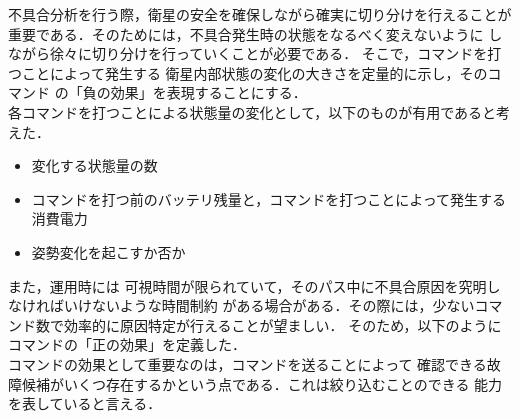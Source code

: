 \documentclass[11pt]{article}
\begin{document}
不具合分析を行う際，衛星の安全を確保しながら確実に切り分けを行えることが
重要である．そのためには，不具合発生時の状態をなるべく変えないように
しながら徐々に切り分けを行っていくことが必要である．
そこで，コマンドを打つことによって発生する
衛星内部状態の変化の大きさを定量的に示し，そのコマンド
の「負の効果」を表現することにする．\\

各コマンドを打つことによる状態量の変化として，以下のものが有用であると考えた．
\begin{itemize}
   \item 変化する状態量の数
   \item コマンドを打つ前のバッテリ残量と，コマンドを打つことによって発生する消費電力
   \item 姿勢変化を起こすか否か
\end{itemize}

また，運用時には
可視時間が限られていて，そのパス中に不具合原因を究明しなければいけないような時間制約
がある場合がある．その際には，少ないコマンド数で効率的に原因特定が行えることが望ましい．
そのため，以下のようにコマンドの「正の効果」を定義した．\\
コマンドの効果として重要なのは，コマンドを送ることによって
確認できる故障候補がいくつ存在するかという点である．これは絞り込むことのできる
能力を表していると言える．
\end{document}
